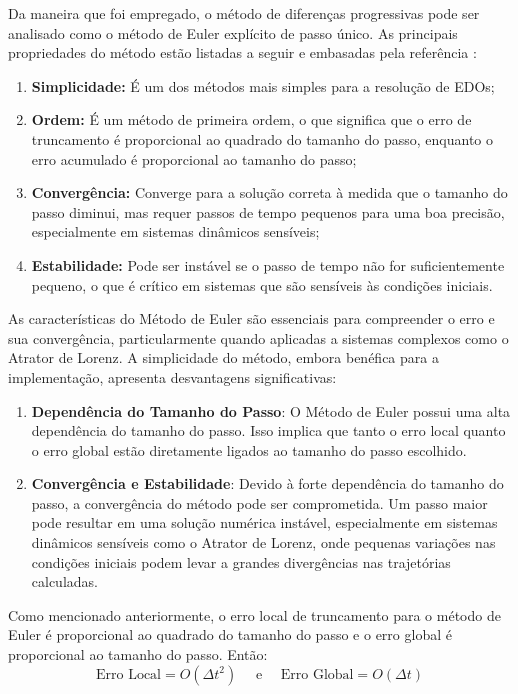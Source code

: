 \documentclass[12pt, a4paper]{article}
\begin{document}
    Da maneira que foi empregado, o método de diferenças progressivas pode ser analisado como o método de Euler explícito de passo único. As principais propriedades do método estão listadas a seguir e embasadas pela referência \cite{Fontana2018}:
        \begin{enumerate}
            \item \textbf{Simplicidade:} É um dos métodos mais simples para a resolução de EDOs;
            \item \textbf{Ordem:} É um método de primeira ordem, o que significa que o erro de truncamento é proporcional ao quadrado do tamanho do passo, enquanto o erro acumulado é proporcional ao tamanho do passo;
            \item \textbf{Convergência:} Converge para a solução correta à medida que o tamanho do passo diminui, mas requer passos de tempo pequenos para uma boa precisão, especialmente em sistemas dinâmicos sensíveis;
            \item \textbf{Estabilidade:} Pode ser instável se o passo de tempo não for suficientemente pequeno, o que é crítico em sistemas que são sensíveis às condições iniciais.
        \end{enumerate}
    
    As características do Método de Euler são essenciais para compreender o erro e sua convergência, particularmente quando aplicadas a sistemas complexos como o Atrator de Lorenz. A simplicidade do método, embora benéfica para a implementação, apresenta desvantagens significativas:
    
    \begin{enumerate}
        \item \textbf{Dependência do Tamanho do Passo}: O Método de Euler possui uma alta dependência do tamanho do passo. Isso implica que tanto o erro local quanto o erro global estão diretamente ligados ao tamanho do passo escolhido.
    
        \item \textbf{Convergência e Estabilidade}: Devido à forte dependência do tamanho do passo, a convergência do método pode ser comprometida. Um passo maior pode resultar em uma solução numérica instável, especialmente em sistemas dinâmicos sensíveis como o Atrator de Lorenz, onde pequenas variações nas condições iniciais podem levar a grandes divergências nas trajetórias calculadas.
    \end{enumerate}
    
    Como mencionado anteriormente, o erro local de truncamento para o método de Euler é proporcional ao quadrado do tamanho do passo e o erro global é proporcional ao tamanho do passo. Então:
    \begin{equation*}
        \text{Erro Local} = O(\Delta t^2) \quad \text{ e } \quad \text{Erro Global} = O(\Delta t) 
    \end{equation*}
    
\end{document}

